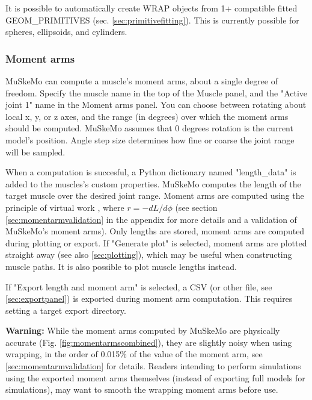 \documentclass{article}
\begin{document}
It is possible to automatically create WRAP objects from 1+ compatible fitted GEOM\_PRIMITIVES (sec. \ref{sec:primitivefitting}). This is currently possible for spheres, ellipsoids, and cylinders.


\subsubsection{Moment arms}

MuSkeMo can compute a muscle's moment arms, about a single degree of freedom. Specify the muscle name in the top of the Muscle panel, and the "Active joint 1"  name in the Moment arms panel. You can choose between rotating about local x, y, or z axes, and the range (in degrees) over which the moment arms should be computed. MuSkeMo assumes that 0 degrees rotation is the current model's position. Angle step size determines how fine or coarse the joint range will be sampled. 

When a computation is succesful, a Python dictionary named "length\_data" is added to the muscles's custom properties. MuSkeMo computes the length of the target muscle over the desired joint range. Moment arms are computed using the principle of virtual work \cite{storaceFunctionalAnalysisRole1979,anDeterminationMuscleOrientations1984}, where \(r = -dL / d\phi \) (see section \ref{sec:momentarmvalidation} in the appendix for more details and a validation of MuSkeMo's moment arms). Only lengths are stored, moment arms are computed during plotting or export. If "Generate plot" is selected, moment arms are plotted straight away (see also \ref{sec:plotting}), which may be useful when constructing muscle paths. It is also possible to plot muscle lengths instead.

If "Export length and moment arm" is selected, a CSV (or other file, see \ref{sec:exportpanel}) is exported during moment arm computation. This requires setting a target export directory.

\textbf{Warning:} While the moment arms computed by MuSkeMo are physically accurate (Fig. \ref{fig:momentarmscombined}), they are slightly noisy when using wrapping, in the order of 0.015\% of the value of the moment arm, see \ref{sec:momentarmvalidation} for details. Readers intending to perform simulations using the exported moment arms themselves (instead of exporting full models for simulations), may want to smooth the wrapping moment arms before use.
\end{document}

